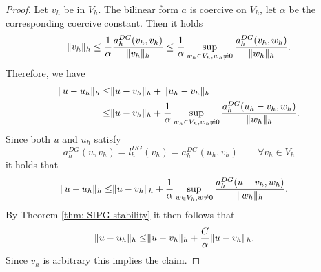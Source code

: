 \begin{proof}
	Let $v_h$ be in $V_h$.
	The bilinear form $a$ is coercive on $V_h$, let $\alpha$ be the corresponding coercive constant. 
	Then it holds
	\[
		\lVert v_h \rVert_{h} \leq \frac 1 \alpha \frac {a_h^{DG}(v_h, v_h)} {\lVert v_h \rVert_{h}} 
		 \leq \frac 1 \alpha \sup_{w_h \in V_h, w_h \neq 0} \frac {a_h^{DG}(v_h,w_h)} {\lVert w_h \rVert_{h}}.
	\]
	Therefore, we have
	\begin{align*}
	\lVert u-u_h \rVert_{h} \leq& \lVert u-v_h \rVert_{h} + \lVert u_h-v_h \rVert_{h} \\
	\leq& \lVert u-v_h \rVert_{h} + \frac 1 \alpha \sup_{w_h \in V_h, w_h \neq 0} \frac {a_h^{DG}(u_h-v_h, w_h) }{\lVert w_h \rVert_{h}}.
	\end{align*}
	Since both $u$ and $u_h$ satisfy
	\[
	a_h^{DG}(u,v_h) = l_h^{DG}(v_h) = a_h^{DG}(u_h,v_h) \qquad \forall v_h \in V_h
	\]
	it holds that
	\begin{align*}
	\lVert u-u_h \rVert_{h} \leq& \lVert u-v_h \rVert_{h} + \frac 1 \alpha \sup_{w \in V_h, w \neq 0} \frac {a_h^{DG}(u-v_h, w_h) }{\lVert w_h \rVert_{h}}.
	\end{align*}
	By Theorem \ref{thm: SIPG stability} it then follows that
	\begin{align*}
	\lVert u-u_h \rVert_{h} \leq& \lVert u-v_h \rVert_{h} + \frac C \alpha \lVert u-v_h \rVert_{h}.
	\end{align*}
	Since $v_h$ is arbitrary this implies the claim.
\end{proof}


